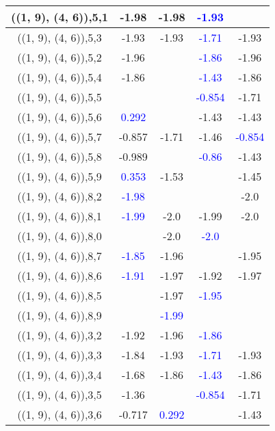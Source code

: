 \documentclass{article}
\begin{document}
\begin{center}
\begin{longtable}{|c|c|c|c|c|}
        	\hline
        	((1, 9), (4, 6)),5,1&-1.98&-1.98& \textcolor{blue}{-1.93}&\\
        	\hline
        	((1, 9), (4, 6)),5,3&-1.93&-1.93& \textcolor{blue}{-1.71}&-1.93\\
        	\hline
        	((1, 9), (4, 6)),5,2&-1.96&& \textcolor{blue}{-1.86}&-1.96\\
        	\hline
        	((1, 9), (4, 6)),5,4&-1.86&& \textcolor{blue}{-1.43}&-1.86\\
        	\hline
        	((1, 9), (4, 6)),5,5&&& \textcolor{blue}{-0.854}&-1.71\\
        	\hline
        	((1, 9), (4, 6)),5,6& \textcolor{blue}{0.292}&&-1.43&-1.43\\
        	\hline
        	((1, 9), (4, 6)),5,7&-0.857&-1.71&-1.46& \textcolor{blue}{-0.854}\\
        	\hline
        	((1, 9), (4, 6)),5,8&-0.989&& \textcolor{blue}{-0.86}&-1.43\\
        	\hline
        	((1, 9), (4, 6)),5,9& \textcolor{blue}{0.353}&-1.53&&-1.45\\
        	\hline
        	((1, 9), (4, 6)),8,2& \textcolor{blue}{-1.98}&&&-2.0\\
        	\hline
        	((1, 9), (4, 6)),8,1& \textcolor{blue}{-1.99}&-2.0&-1.99&-2.0\\
        	\hline
        	((1, 9), (4, 6)),8,0&&-2.0& \textcolor{blue}{-2.0}&\\
        	\hline
        	((1, 9), (4, 6)),8,7& \textcolor{blue}{-1.85}&-1.96&&-1.95\\
        	\hline
        	((1, 9), (4, 6)),8,6& \textcolor{blue}{-1.91}&-1.97&-1.92&-1.97\\
        	\hline
        	((1, 9), (4, 6)),8,5&&-1.97& \textcolor{blue}{-1.95}&\\
        	\hline
        	((1, 9), (4, 6)),8,9&& \textcolor{blue}{-1.99}&&\\
        	\hline
        	((1, 9), (4, 6)),3,2&-1.92&-1.96& \textcolor{blue}{-1.86}&\\
        	\hline
        	((1, 9), (4, 6)),3,3&-1.84&-1.93& \textcolor{blue}{-1.71}&-1.93\\
        	\hline
        	((1, 9), (4, 6)),3,4&-1.68&-1.86& \textcolor{blue}{-1.43}&-1.86\\
        	\hline
        	((1, 9), (4, 6)),3,5&-1.36&& \textcolor{blue}{-0.854}&-1.71\\
        	\hline
        	((1, 9), (4, 6)),3,6&-0.717& \textcolor{blue}{0.292}&&-1.43\\

\end{longtable}
\end{center}
\end{document}
